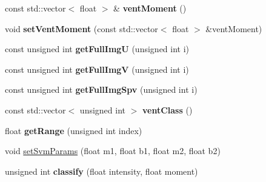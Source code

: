 \begin{DoxyCompactItemize}
\item 
const std\+::vector$<$ float $>$ \& {\bfseries vent\+Moment} ()\hypertarget{classLaserData_aa607966f256d543a285b0e0823af6ca5}{}\label{classLaserData_aa607966f256d543a285b0e0823af6ca5}

\item 
void {\bfseries set\+Vent\+Moment} (const std\+::vector$<$ float $>$ \&vent\+Moment)\hypertarget{classLaserData_a88743b5ab7119e10e3ac93fdd840e75c}{}\label{classLaserData_a88743b5ab7119e10e3ac93fdd840e75c}

\item 
const unsigned int {\bfseries get\+Full\+ImgU} (unsigned int i)\hypertarget{classLaserData_af506c8333b4faa94722a0682ec10ce09}{}\label{classLaserData_af506c8333b4faa94722a0682ec10ce09}

\item 
const unsigned int {\bfseries get\+Full\+ImgV} (unsigned int i)\hypertarget{classLaserData_ac52435fa31f562ff9f5418a016b3d997}{}\label{classLaserData_ac52435fa31f562ff9f5418a016b3d997}

\item 
const unsigned int {\bfseries get\+Full\+Img\+Spv} (unsigned int i)\hypertarget{classLaserData_a2cd6aa3eba2c08027b1e4a6fb4935e00}{}\label{classLaserData_a2cd6aa3eba2c08027b1e4a6fb4935e00}

\item 
const std\+::vector$<$ unsigned int $>$ {\bfseries vent\+Class} ()\hypertarget{classLaserData_ad776d9688a1963f839a2a7d2eb551660}{}\label{classLaserData_ad776d9688a1963f839a2a7d2eb551660}

\item 
float {\bfseries get\+Range} (unsigned int index)\hypertarget{classLaserData_af8870494408bdc3f9f2c8d38dbf33b72}{}\label{classLaserData_af8870494408bdc3f9f2c8d38dbf33b72}

\item 
void \hyperlink{classLaserData_ac1f48af1c563bdebda713e818349c2d6}{set\+Svm\+Params} (float m1, float b1, float m2, float b2)
\item 
unsigned int {\bfseries classify} (float intensity, float moment)\hypertarget{classLaserData_a8ef58919e903663010cefebc8f2f5de0}{}\label{classLaserData_a8ef58919e903663010cefebc8f2f5de0}

\end{DoxyCompactItemize}
